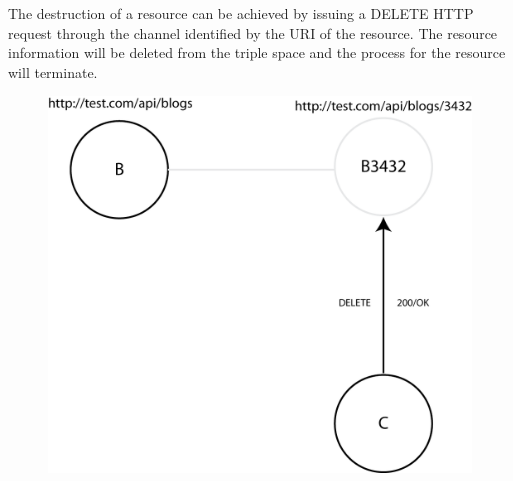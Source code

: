 The destruction of a resource can be achieved by issuing a DELETE HTTP request through the channel identified by the URI of the resource. The resource information will be deleted from the triple space and the process for the resource will terminate.

\begin{figure}[htb!]
\centering%
\includegraphics{get_del.png}
\end{figure}

